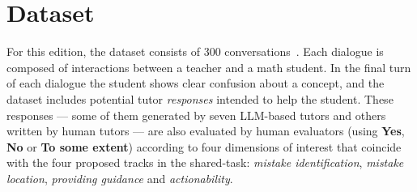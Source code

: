 \documentclass[11pt]{article}
\newcommand{\todo}[1]{\textcolor{blue}{\textbf{\small [TODO: #1]}}}
\begin{document}



\section{Dataset}
\label{sec:dataset}


For this edition, the dataset consists of 300 conversations~\cite{maurya-etal-2025-unifying}.
Each dialogue is composed of interactions between a teacher and a math student.
In the final turn of each dialogue the student shows clear confusion about a concept, and the dataset includes potential tutor \textit{responses} intended to help the student.
These responses --- some of them generated by seven LLM-based tutors and others written by human tutors ---  are also evaluated by human evaluators (using \textbf{Yes}, \textbf{No} or \textbf{To some extent}) according to four dimensions of interest that coincide with the four proposed tracks in the shared-task: \textit{mistake identification}, \textit{mistake location}, \textit{providing guidance} and \textit{actionability}.
\end{document}
